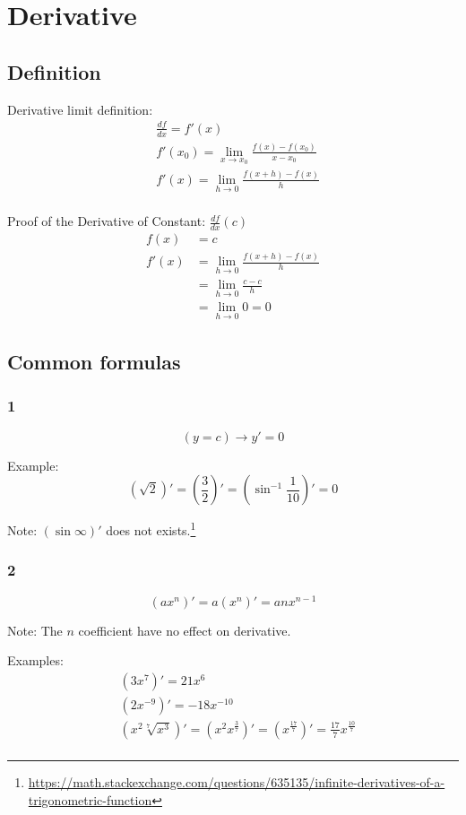 \chapter{Derivative}
\section{Definition}
Derivative limit definition:
\begin{align*}
&\frac{df}{dx} = f'(x) \\
&f'(x_0) = \lim_{x\to x_0} \frac{f(x) - f(x_0)}{x-x_0} \\
&f'(x) = \lim_{h\to 0} \frac{f(x+h) - f(x)}{h} \\
\end{align*}

Proof of the Derivative of Constant: $\frac{df}{dx}(c)$
\begin{align*}
f(x) &= c \\
f'(x) &= \lim_{h\to 0}\frac{f(x+h) - f(x)}{h} \\
&= \lim_{h\to 0}\frac{c - c}{h} \\
&= \lim_{h\to 0} 0 = 0
\end{align*}

\section{Common formulas}
\subsection{1}
\[ (y = c)\to y'= 0 \]

Example:
\[ (\sqrt{2})' = (\frac{3}{2})' = (\sin^{-1}\frac{1}{10})' = 0 \]

Note: $(\sin\infty)'$ does not exists.\footnote{\href{https://math.stackexchange.com/questions/635135/infinite-derivatives-of-a-trigonometric-function}{https://math.stackexchange.com/questions/635135/infinite-derivatives-of-a-trigonometric-function}}

\subsection{2}
\[ (ax^n)' = a(x^n)' = anx^{n-1} \]

Note: The $n$ coefficient have no effect on derivative.

Examples:
\begin{align*}
&(3x^7)' = 21x^6 \\
&(2x^{-9})' = -18x^{-10} \\
&(x^{2}\sqrt[7]{x^3})'=
	(x^2 x^{\frac{3}{7}})' =
	(x^{\frac{17}{7}})' =
	\frac{17}{7} x^{\frac{10}{7}} \\
\end{align*}

